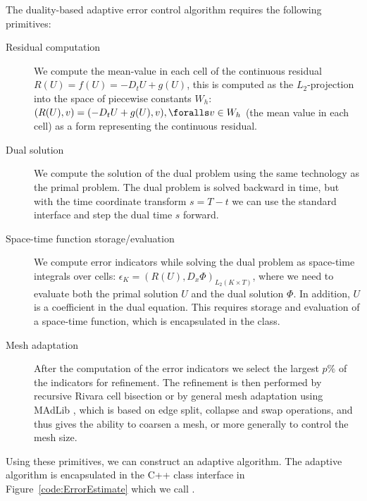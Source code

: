 The duality-based adaptive error control algorithm requires the following
primitives:

\begin{description}
\item[Residual computation]
We compute the mean-value in each cell of the continuous residual
$R(U) = f(U) = -D_t U + g(U)$, this is computed as the
$L_2$-projection into the space of piecewise constants $W_h$: $(R(U),
v) = (-D_t U + g(U), v), \foralls v \in W_h$ (the mean value in each
cell) as a form representing the continuous residual.

\item[Dual solution]
We compute the solution of the dual problem using the same technology
as the primal problem. The dual problem is solved backward in time,
but with the time coordinate transform $s = T - t$ we can use the
standard  interface and step the dual time $s$
forward.

\item[Space-time function storage/evaluation]
We compute error indicators while solving the dual problem as
space-time integrals over cells: $\epsilon_K = (R(U),
D_x \Phi)_{L_2(K \times T)}$, where we need to evaluate both the
primal solution $U$ and the dual solution $\Phi$. In addition, $U$ is
a coefficient in the dual equation. This requires storage and
evaluation of a space-time function, which is encapsulated in
the  class.

\item[Mesh adaptation]
After the computation of the error indicators we select the largest
$p\%$ of the indicators for refinement. The refinement is then
performed by recursive Rivara cell bisection or by general mesh
adaptation using MAdLib \citep{Comp`ereRemacleJanssonEtAl2009}, which is
based on edge split, collapse and swap operations, and thus gives
the ability to coarsen a mesh, or more generally to control the mesh
size.
\end{description}

Using these primitives, we can construct an adaptive algorithm. The
adaptive algorithm is encapsulated in the C++ class interface in
Figure~\ref{code:ErrorEstimate} which we call .

